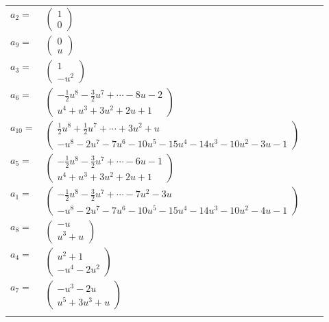 \documentclass[1p]{elsarticle_modified}
\theoremstyle{definition}
\begin{document}
\begin{tabular}{m{7pt} m{180pt} m{7pt} m{180pt} }
\flushright $a_{2}=$&$\begin{pmatrix}1\\0\end{pmatrix}$ \\
\flushright $a_{9}=$&$\begin{pmatrix}0\\u\end{pmatrix}$ \\
\flushright $a_{3}=$&$\begin{pmatrix}1\\- u^2\end{pmatrix}$ \\
\flushright $a_{6}=$&$\begin{pmatrix}-\frac{1}{2} u^8-\frac{3}{2} u^7+\cdots-8 u-2\\u^4+u^3+3 u^2+2 u+1\end{pmatrix}$ \\
\flushright $a_{10}=$&$\begin{pmatrix}\frac{1}{2} u^8+\frac{1}{2} u^7+\cdots+3 u^2+u\\- u^8-2 u^7-7 u^6-10 u^5-15 u^4-14 u^3-10 u^2-3 u-1\end{pmatrix}$ \\
\flushright $a_{5}=$&$\begin{pmatrix}-\frac{1}{2} u^8-\frac{3}{2} u^7+\cdots-6 u-1\\u^4+u^3+3 u^2+2 u+1\end{pmatrix}$ \\
\flushright $a_{1}=$&$\begin{pmatrix}-\frac{1}{2} u^8-\frac{3}{2} u^7+\cdots-7 u^2-3 u\\- u^8-2 u^7-7 u^6-10 u^5-15 u^4-14 u^3-10 u^2-4 u-1\end{pmatrix}$ \\
\flushright $a_{8}=$&$\begin{pmatrix}- u\\u^3+u\end{pmatrix}$ \\
\flushright $a_{4}=$&$\begin{pmatrix}u^2+1\\- u^4-2 u^2\end{pmatrix}$ \\
\flushright $a_{7}=$&$\begin{pmatrix}- u^3-2 u\\u^5+3 u^3+u\end{pmatrix}$\\&\end{tabular}
\end{document}
